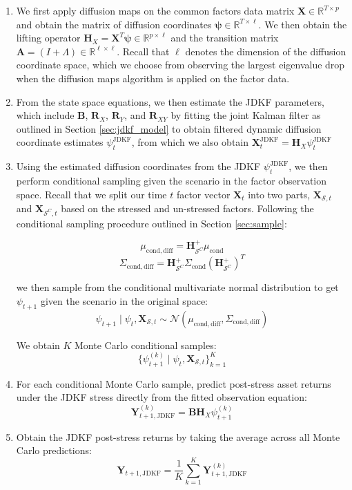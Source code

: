 \documentclass[11pt]{article}
\theoremstyle{plain}
\theoremstyle{definition}
\theoremstyle{remark}
\numberwithin{equation}{section}
\begin{document}
\begin{enumerate}
    \item We first apply diffusion maps on the common factors data matrix $\mathbf{X} \in \mathbb R^{T \times p}$ and obtain the matrix of diffusion coordinates $\mathbf{\psi} \in \mathbb{R}^{T \times \ell}$. We then obtain the lifting operator $\mathbf{H}_X=\mathbf{X}^T \mathbf{\psi} \in \mathbb{R}^{p \times \ell}$ and the transition matrix $\mathbf{A}=(I+\Lambda) \in \mathbb{R}^{\ell \times \ell}$. Recall that $\ell$ denotes the dimension of the diffusion coordinate space, which we choose from observing the largest eigenvalue drop when the diffusion maps algorithm is applied on the factor data. 
    \item From the state space equations, we then estimate the JDKF parameters, which include $\mathbf{B}$, $\mathbf{R}_X$, $\mathbf{R}_Y$, and $\mathbf{R}_{XY}$ by fitting the joint Kalman filter as outlined in Section \ref{sec:jdkf_model} to obtain filtered dynamic diffusion coordinate estimates $\psi_{t}^{\mathrm{JDKF}}$, from which we also obtain $\mathbf{X}_{t}^{\mathrm{JDKF}}=\mathbf{H}_X \psi_{t}^{\mathrm{JDKF}}$
    \item Using the estimated diffusion coordinates from the JDKF $\psi_t^{\mathrm{JDKF}}$, we then perform conditional sampling given the scenario in the factor observation space. Recall that we split our time $t$ factor vector $\mathbf{X}_{t}$ into two parts, $\mathbf{X}_{\mathcal{S}, t}$ and $\mathbf{X}_{\mathcal{S}^C, t}$ based on the stressed and un-stressed factors. Following the conditional sampling procedure outlined in Section \ref{sec:sample}:

    \[\mu_{\mathrm{cond, diff}} = \mathbf{H}_{\mathcal{S}^C}^{+} \mu_{\mathrm{cond}}\]
\[\Sigma_{\mathrm{cond, diff}} = \mathbf{H}_{\mathcal{S}^C}^{+} \Sigma_{\mathrm{cond}} (\mathbf{H}_{\mathcal{S}^C}^{+})^T\]

we then sample from the conditional multivariate normal distribution to get $\psi_{t+1}$ given the scenario in the original space:
\[\psi_{t+1} \mid \psi_t, \mathbf{X}_{\mathcal{S}, t} \sim \mathcal{N}(\mu_{\mathrm{cond, diff}}, \Sigma_{\mathrm{cond, diff}})\]

We obtain $K$ Monte Carlo conditional samples:
\[ \{\psi^{(k)}_{t+1} \mid \psi_t, \mathbf{X}_{\mathcal{S}, t}\}_{k=1}^K\]
    
    \item For each conditional Monte Carlo sample, predict post-stress asset returns under the JDKF stress directly from the fitted observation equation:
\[\mathbf{Y}_{t+1, \mathrm{JDKF}}^{(k)}=\mathbf{B}\mathbf{H}_X \psi_{t+1}^{(k)}\]

    \item Obtain the JDKF post-stress returns by taking the average across all Monte Carlo predictions:
\[\mathbf{Y}_{t+1, \mathrm{JDKF}}=\frac{1}{K} \sum_{k=1}^K \mathbf{Y}_{t+1, \mathrm{JDKF}}^{(k)}\]

\end{enumerate}
\end{document}
